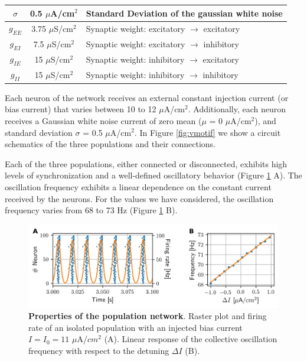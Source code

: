 \documentclass[../main.tex]{subfiles}
\begin{document}
\begin{table}[htbp]
\begin{tabularx}{\textwidth}{|c|c|X|}
         $\sigma$           & 0.5 $\mu$A/cm$^2$   & Standard Deviation of the gaussian white noise\\ \hline
         $g_{EE}$           & 3.75 $\mu$S/cm$^2$  & Synaptic weight: excitatory $\rightarrow$ excitatory\\ \hline
         $g_{EI}$           & 7.5 $\mu$S/cm$^2$   & Synaptic weight: excitatory $\rightarrow$ inhibitory\\ \hline
         $g_{IE}$           & 15 $\mu$S/cm$^2$    & Synaptic weight: inhibitory $\rightarrow$ excitatory\\ \hline
         $g_{II}$           & 15 $\mu$S/cm$^2$    & Synaptic weight: inhibitory $\rightarrow$ inhibitory\\ \hline
    \end{tabularx}
    \label{table:parameters}
\end{table}
Each neuron of the network receives an external constant injection current (or bias current) that varies between 10 to 12 $\mu$A/cm$^2$.
Additionally, each neuron receives a Gaussian white noise current of zero mean ($\mu$ = 0 $\mu$A/cm$^2$), and standard deviation $\sigma$ = 0.5 $\mu$A/cm$^2$.
In Figure \ref{fig:vmotif} we show a circuit schematics of the three populations and their connections.

Each of the three populations, either connected or disconnected, exhibits high levels of synchronization and a well-defined oscillatory behavior \citep{pariz_transmission_2021} (Figure \ref{fig:population-dynamics} A). 
The oscillation frequency exhibits a linear dependence on the constant current received by the neurons.
For the values we have considered, the oscillation frequency varies from 68 to 73 Hz (Figure \ref{fig:population-dynamics} B).
\begin{figure}[t]
    \centering
    \includegraphics[width=\textwidth]{chapter2/figures/fig0s}
    \caption{\textbf{Properties of the population network}.
    Raster plot and firing rate of an isolated population with an injected bias current $I=I_0 = 11$  $\mu$A/$cm^2$ (A).
    Linear response of the collective oscillation frequency with respect to the detuning $\Delta I$ (B).}
    \label{fig:population-dynamics}
\end{figure}
\end{document}
